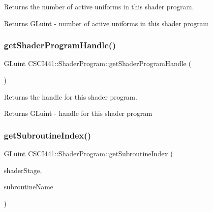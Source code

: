 Returns the number of active uniforms in this shader program. 

\begin{DoxyReturn}{Returns}
G\+Luint -\/ number of active uniforms in this shader program 
\end{DoxyReturn}
\mbox{\label{class_c_s_c_i441_1_1_shader_program_aa1003cd55af666853561d97fac94b92b}} 
\subsubsection{\texorpdfstring{get\+Shader\+Program\+Handle()}{getShaderProgramHandle()}}
{\footnotesize\ttfamily G\+Luint C\+S\+C\+I441\+::\+Shader\+Program\+::get\+Shader\+Program\+Handle (\begin{DoxyParamCaption}{ }\end{DoxyParamCaption})}



Returns the handle for this shader program. 

\begin{DoxyReturn}{Returns}
G\+Luint -\/ handle for this shader program 
\end{DoxyReturn}
\mbox{\label{class_c_s_c_i441_1_1_shader_program_a6a8732a9fb89b0870c40ed5d8b8b7c09}} 
\subsubsection{\texorpdfstring{get\+Subroutine\+Index()}{getSubroutineIndex()}}
{\footnotesize\ttfamily G\+Luint C\+S\+C\+I441\+::\+Shader\+Program\+::get\+Subroutine\+Index (\begin{DoxyParamCaption}\item[{G\+Lenum}]{shader\+Stage,  }\item[{const char $\ast$}]{subroutine\+Name }\end{DoxyParamCaption})}



